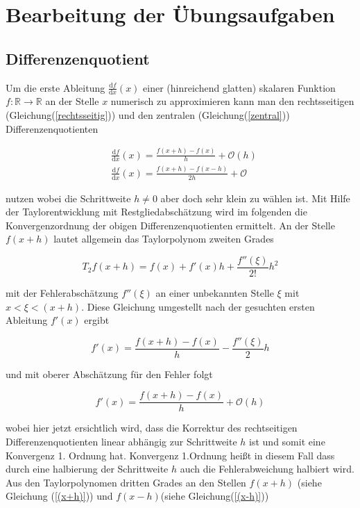 \chapter{Bearbeitung der Übungsaufgaben}

\section{Differenzenquotient}

Um die erste Ableitung $\frac{\mathrm{d}f}{\mathrm{d}x}(x)$ einer (hinreichend glatten) skalaren Funktion $f: \mathbb{R} \rightarrow \mathbb{R}$ an der Stelle $x$ numerisch zu approximieren kann man den rechtsseitigen (Gleichung(\ref{rechtsseitig})) und den zentralen (Gleichung(\ref{zentral})) Differenzenquotienten 

\begin{align}
	&\frac{\mathrm{d}f}{\mathrm{d}x}(x) = \frac{f(x+h)-f(x)}{h} + \mathcal{O}(h) \label{rechtsseitig}\\
	&\frac{\mathrm{d}f}{\mathrm{d}x}(x) = \frac{f(x+h)-f(x-h)}{2h} + \mathcal{O}
	\label{zentral}
\end{align}

nutzen wobei die Schrittweite $h \neq 0$ aber doch sehr klein zu wählen ist. Mit Hilfe der Taylorentwicklung mit Restgliedabschätzung wird im folgenden die Konvergenzordnung der obigen Differenzenquotienten ermittelt. An der Stelle $f(x+h)$ lautet allgemein das Taylorpolynom zweiten Grades 

\begin{equation*}
	T_2f(x+h)= f(x) +f'(x)h +\frac{f''(\xi)}{2!}h^2
\end{equation*}

mit der Fehlerabschätzung $f''(\xi)$ an einer unbekannten Stelle $\xi$ mit $ x <\xi <(x+h)$. Diese Gleichung umgestellt nach der gesuchten ersten Ableitung $f'(x)$ ergibt 

\begin{equation}
	f'(x) = \frac{f(x+h)-f(x)}{h}-\frac{f''(\xi)}{2}h
	\label{mitFehler}
\end{equation}

und mit oberer Abschätzung für den Fehler folgt 

\begin{equation}
	f'(x) = \frac{f(x+h)-f(x)}{h}+\mathcal{O}(h)
	\label{ohneFehler}
\end{equation}

wobei hier jetzt ersichtlich wird, dass die Korrektur des rechtseitigen Differenzenquotienten linear abhängig zur Schrittweite $h$ ist und somit eine Konvergenz 1. Ordnung hat. Konvergenz 1.Ordnung heißt in diesem Fall dass durch eine halbierung der Schrittweite $h$ auch die Fehlerabweichung halbiert wird.\\
Aus den Taylorpolynomen dritten Grades an den Stellen $f(x+h)$ (siehe Gleichung (\ref{(x+h)})) und $f(x-h)$(siehe Gleichung(\ref{(x-h)}))

